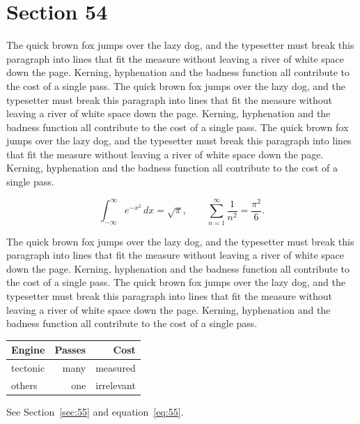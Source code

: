 \documentclass{article}
\begin{document}
\section{Section 54}
\label{sec:54}
The quick brown fox jumps over the lazy dog, and the typesetter must break this paragraph into lines that fit the measure without leaving a river of white space down the page. Kerning, hyphenation and the badness function all contribute to the cost of a single pass. The quick brown fox jumps over the lazy dog, and the typesetter must break this paragraph into lines that fit the measure without leaving a river of white space down the page. Kerning, hyphenation and the badness function all contribute to the cost of a single pass. The quick brown fox jumps over the lazy dog, and the typesetter must break this paragraph into lines that fit the measure without leaving a river of white space down the page. Kerning, hyphenation and the badness function all contribute to the cost of a single pass. 

\begin{equation}\label{eq:54}
\int_{-\infty}^{\infty} e^{-x^{2}}\,dx = \sqrt{\pi}, \qquad
\sum_{n=1}^{\infty} \frac{1}{n^{2}} = \frac{\pi^{2}}{6}.
\end{equation}

The quick brown fox jumps over the lazy dog, and the typesetter must break this paragraph into lines that fit the measure without leaving a river of white space down the page. Kerning, hyphenation and the badness function all contribute to the cost of a single pass. The quick brown fox jumps over the lazy dog, and the typesetter must break this paragraph into lines that fit the measure without leaving a river of white space down the page. Kerning, hyphenation and the badness function all contribute to the cost of a single pass. 

\begin{center}
\begin{tabular}{lrr}
\toprule
Engine & Passes & Cost \\
\midrule
tectonic & many & measured \\
others & one & irrelevant \\
\bottomrule
\end{tabular}
\end{center}

See Section~\ref{sec:55} and equation~\eqref{eq:55}.
\end{document}

